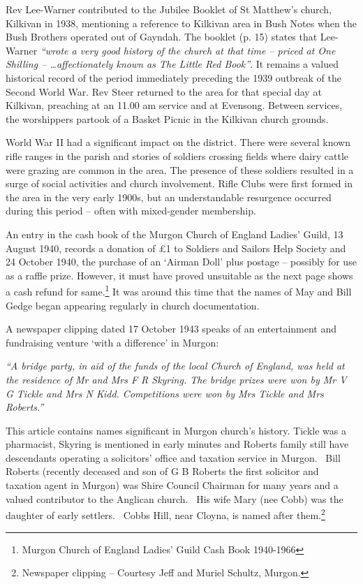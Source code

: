 Rev Lee-Warner contributed to the Jubilee Booklet of St Matthew's church, Kilkivan in 1938, mentioning a reference to Kilkivan area in Bush Notes when the Bush Brothers operated out of Gayndah. The booklet (p. 15) states that Lee-Warner \emph{``wrote a very good history of the church at that time -- priced at One Shilling -- \ldots affectionately known as The Little Red Book''}. It remains a valued historical record of the period immediately preceding the 1939 outbreak of the Second World War. Rev Steer returned to the area for that special day at Kilkivan, preaching at an 11.00 am service and at Evensong. Between services, the worshippers partook of a Basket Picnic in the Kilkivan church grounds.



World War II had a significant impact on the district. There were several known rifle ranges in the parish and stories of soldiers crossing fields where dairy cattle were grazing are common in the area. The presence of these soldiers resulted in a surge of social activities and church involvement. Rifle Clubs were first formed in the area in the very early 1900s, but an understandable resurgence occurred during this period -- often with mixed-gender membership.



An entry in the cash book of the Murgon Church of England Ladies' Guild, 13 August 1940, records a donation of \pounds1 to Soldiers and Sailors Help Society and 24 October 1940, the purchase of an `Airman Doll' plus postage -- possibly for use as a raffle prize. However, it must have proved unsuitable as the next page shows a cash refund for same.\footnote{Murgon Church of England Ladies' Guild Cash Book 1940-1966} It was around this time that the names of May and Bill Gedge began appearing regularly in church documentation.


A newspaper clipping dated 17 October 1943 speaks of an entertainment and fundraising venture `with a difference' in Murgon:



\emph{``A bridge party, in aid of the funds of the local Church of England, was held at the residence of Mr and Mrs F R Skyring. The bridge prizes were won by Mr V G Tickle and Mrs N Kidd. Competitions were won by Mrs Tickle and Mrs Roberts.''}



\smallskip


This article contains names significant in Murgon church's history. Tickle was a pharmacist, Skyring is mentioned in early minutes and Roberts family still have descendants operating a solicitors' office and taxation service in Murgon.~ Bill Roberts (recently deceased and son of G B Roberts the first solicitor and taxation agent in Murgon) was Shire Council Chairman for many years and a valued contributor to the Anglican church.~ His wife Mary (nee Cobb) was the daughter of early settlers.~ Cobbs Hill, near Cloyna, is named after them.\footnote{Newspaper clipping -- Courtesy Jeff and Muriel Schultz, Murgon.}


